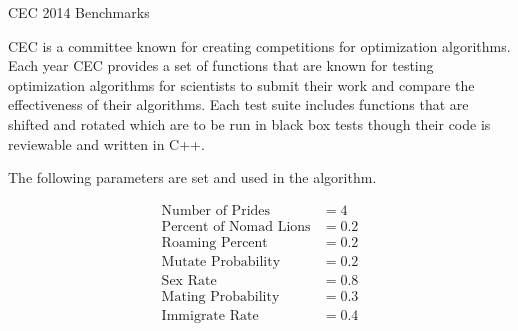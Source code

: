 \documentclass{beamer}
\begin{document}
\begin{frame}{CEC 2014 Benchmarks}

CEC is a committee known for creating competitions for optimization algorithms. Each year CEC provides a set of functions that are known for testing optimization algorithms for scientists to submit their work and compare the effectiveness of their algorithms. Each test suite includes functions that are shifted and rotated which are to be run in black box tests though their code is reviewable and written in C++.

The following parameters are set and used in the algorithm.

\begin{align*}
\text{Number of Prides} &= 4\\
\text{Percent of Nomad Lions} &= 0.2\\
\text{Roaming Percent} &= 0.2\\
\text{Mutate Probability} &= 0.2\\
\text{Sex Rate} &= 0.8\\
\text{Mating Probability} &= 0.3\\
\text{Immigrate Rate} &= 0.4\\
\end{align*}
\end{frame}
\end{document}
